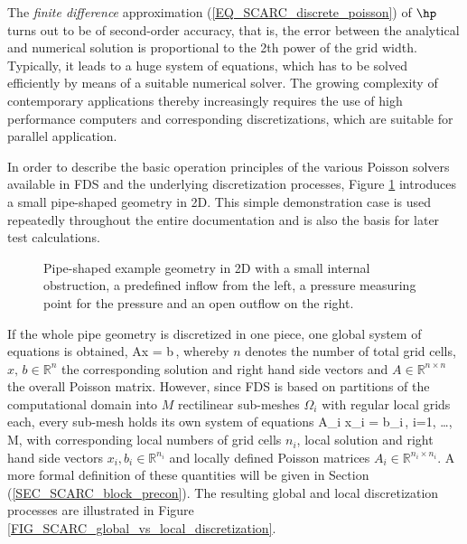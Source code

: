 The {\it finite difference} approximation (\ref{EQ_SCARC_discrete_poisson})
of $\hp$ turns out to be of second-order accuracy, that is, the error between the analytical and numerical solution is proportional to the 2th power of the grid width. Typically, it leads to a huge system of equations, which has to be solved efficiently by means of a suitable numerical solver.
The growing complexity of contemporary applications thereby increasingly requires the use of high performance computers and corresponding discretizations, which are suitable for parallel application.

In order to describe the basic operation principles of the various Poisson solvers available in FDS and the underlying discretization processes,
Figure \ref{FIG_SCARC_basic_pipe_geometry} introduces a small pipe-shaped geometry in 2D. This simple demonstration case is used repeatedly throughout the entire documentation and is also the basis for later test calculations.
\begin{figure}[ht]
\begin{center}

\end{center}
\caption[Pipe-shaped geometry in 2D]{Pipe-shaped example geometry in 2D with a small internal obstruction,
a predefined inflow from the left, a pressure measuring point for the pressure and an open outflow on the right.}
\label{FIG_SCARC_basic_pipe_geometry}
\end{figure}

If the whole pipe geometry is discretized in one piece, one global system of equations is 
obtained,
\be 
  Ax = b\,, 
  \label{EQ_SCARC_single_system}
\ee
whereby $n$ denotes the number of total grid cells, 
$x, \,b\in\mathbb{R}^n$ the corresponding solution and right hand side vectors and $A \in \mathbb{R}^{n \times n}$ the overall Poisson matrix. 
%
However, since FDS is based on partitions of the computational domain into $M$ rectilinear sub-meshes $\Omega_i$ with regular local grids each, every sub-mesh holds its own system of equations 
\be 
   A_i x_i = b_i\,, \qquad i=1, \ldots, M, 
  \label{EQ_SCARC_multi_system}
\ee
with corresponding local numbers of grid cells $n_i$,  local solution and right hand side vectors $x_i, b_i \in \mathbb{R}^{n_i}$ and locally defined Poisson matrices $A_i \in \mathbb{R}^{n_i \times n_i}$. 
A more formal definition of these quantities will be given in Section (\ref{SEC_SCARC_block_precon}).
The resulting global and local discretization processes are illustrated in Figure \ref{FIG_SCARC_global_vs_local_discretization}.



